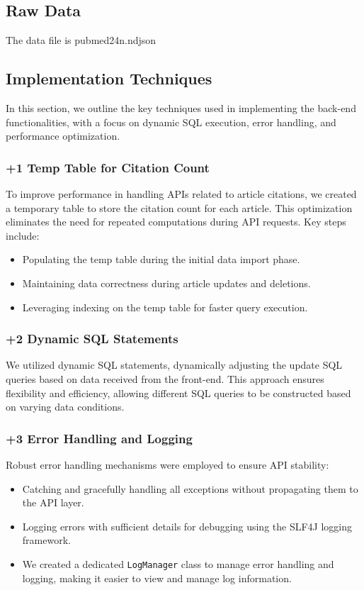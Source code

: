 \documentclass{article}
\begin{document}
\subsection{Raw Data}
The data file is pubmed24n.ndjson
\subsection{Implementation Techniques}
In this section, we outline the key techniques used in implementing the back-end functionalities, with a focus on dynamic SQL execution, error handling, and performance optimization.


\subsubsection*{\uppercase\expandafter{\romannumeral+1} Temp Table for Citation Count}
To improve performance in handling APIs related to article citations, we created a temporary table to store the citation count for each article. This optimization eliminates the need for repeated computations during API requests. Key steps include:
\begin{itemize}
    \item Populating the temp table during the initial data import phase.
    \item Maintaining data correctness during article updates and deletions.
    \item Leveraging indexing on the temp table for faster query execution.
\end{itemize}

\subsubsection*{\uppercase\expandafter{\romannumeral+2} Dynamic SQL Statements}
We utilized dynamic SQL statements, dynamically adjusting the update SQL queries based on data received from the front-end. This approach ensures flexibility and efficiency, allowing different SQL queries to be constructed based on varying data conditions.

\subsubsection*{\uppercase\expandafter{\romannumeral+3} Error Handling and Logging}
Robust error handling mechanisms were employed to ensure API stability:
\begin{itemize}
    \item Catching and gracefully handling all exceptions without propagating them to the API layer.
    \item Logging errors with sufficient details for debugging using the SLF4J logging framework.
    \item We created a dedicated \texttt{LogManager} class to manage error handling and logging, making it easier to view and manage log information.
\end{itemize}
\end{document}
